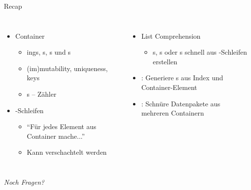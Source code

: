 
\begin{frame}[t,plain]
\titlepage
\end{frame}


\begin{frame}{Recap}
%
\begin{columns}[T]
\begin{itemize}
\item Container
	\begin{itemize}
	\item {}ings, s, s und s
	\item (im)mutability, uniqueness, keys
	\item {}s -- Zähler
	\end{itemize}
\item {}-Schleifen
	\begin{itemize}
	\item \enquote{Für jedes Element aus Container mache...}
	\item Kann verschachtelt werden
	\end{itemize}
\end{itemize}
%
\begin{itemize}
\item List Comprehension
	\begin{itemize}
	\item {}s, s oder s schnell aus -Schleifen erstellen
	\end{itemize}
\item {}: Generiere s aus Index und Container-Element
\item {}: Schnüre Datenpakete aus mehreren Containern
\end{itemize}

\end{columns}
%
\begin{center}
	\emph{Noch Fragen?}
\end{center}
%
\end{frame}


